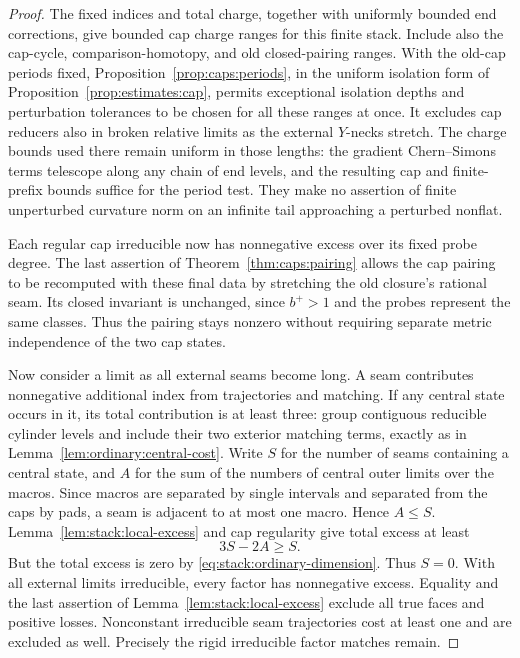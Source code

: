 \begin{proof}
The fixed indices and total charge, together with uniformly bounded
end corrections, give bounded cap charge ranges for this finite stack.
Include also the cap-cycle, comparison-homotopy, and old closed-pairing
ranges.  With the old-cap periods fixed, Proposition~\ref{prop:caps:periods},
in the uniform isolation form of Proposition~\ref{prop:estimates:cap},
permits exceptional isolation depths and perturbation tolerances to be
chosen for all these ranges at once.  It excludes cap reducers also in broken
relative limits as the external \(Y\)-necks stretch.  The charge
bounds used there remain uniform in those lengths: the gradient
Chern--Simons terms telescope along any chain of end levels, and the
resulting cap and finite-prefix bounds suffice for the period test.
They make no assertion of finite unperturbed curvature norm on an
infinite tail approaching a perturbed nonflat.

Each regular cap irreducible now has nonnegative excess over its fixed
probe degree.  The last assertion of Theorem~\ref{thm:caps:pairing}
allows the cap pairing to be recomputed with these final data by
stretching the old closure's rational seam.  Its closed invariant is
unchanged, since \(b^+>1\) and the probes represent the same classes.
Thus the pairing stays nonzero without requiring separate metric
independence of the two cap states.

Now consider a limit as all external seams become long.  A seam
contributes nonnegative additional index from trajectories and
matching.  If any central state occurs in it, its total contribution
is at least three: group contiguous reducible cylinder levels and
include their two exterior matching terms, exactly as in
Lemma~\ref{lem:ordinary:central-cost}.  Write \(S\) for the number
of seams containing a central state, and \(A\) for the sum of the
numbers of central outer limits over the macros.  Since macros are
separated by single intervals and separated from the caps by pads,
a seam is adjacent to at most one macro.  Hence \(A\le S\).
Lemma~\ref{lem:stack:local-excess} and cap regularity give total
excess at least
\[
 3S-2A\ge S.
\]
But the total excess is zero by
\eqref{eq:stack:ordinary-dimension}.  Thus \(S=0\).
With all external limits irreducible, every factor has nonnegative
excess.  Equality and the last assertion of
Lemma~\ref{lem:stack:local-excess} exclude all true faces and
positive losses.  Nonconstant irreducible seam trajectories cost
at least one and are excluded as well.  Precisely the rigid
irreducible factor matches remain.


\end{proof}
